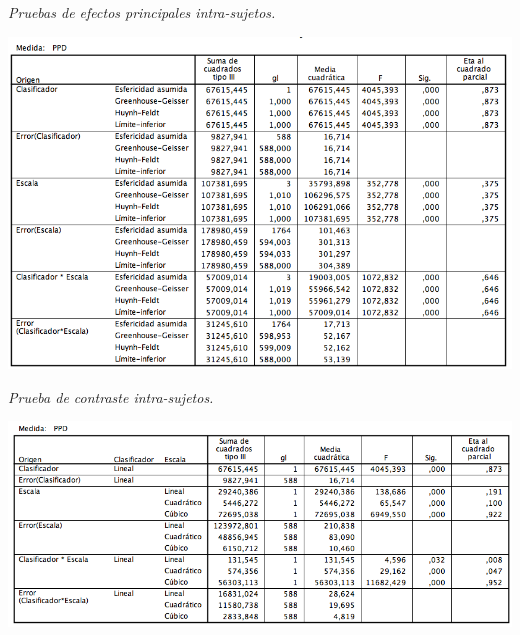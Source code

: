 \begin{table}[htc]
  \centering
  \caption{\em Pruebas de efectos principales intra-sujetos.}  
  \label{fig:efectos}
  \includegraphics[scale=.4]{images/efectos}
\end{table}

\begin{table}[htc]
  \centering
  \caption{\em Prueba de contraste intra-sujetos.}  
  \label{fig:contraste}
  \includegraphics[scale=.5]{images/contraste}
\end{table}
